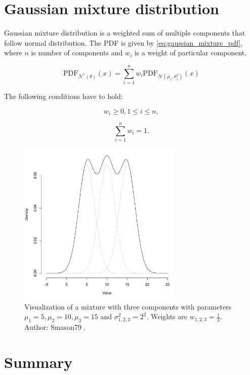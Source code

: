 \documentclass[thesis=B,english]{FITthesis}[2012/06/26]
\begin{document}
\section{Gaussian mixture distribution}

Gaussian mixture distribution is a weighted sum of multiple components that follow normal distribution. The PDF is given by \ref{eq:gaussian_mixture_pdf}, where $n$ is number of components and $w_i$ is a weight of particular component.

\begin{equation} \label{eq:gaussian_mixture_pdf}
\text{PDF}_{\mathcal{N}^*(\theta)}(x) = \sum_{i=1}^n w_i \text{PDF}_{\mathcal{N}(\mu_i,\sigma^2_i)}(x)
\end{equation}

The following conditions have to hold:

\begin{equation*}
w_i \geq 0, 1 \leq i \leq n,
\end{equation*}

\begin{equation*}
\sum_{i=1}^n w_i = 1.
\end{equation*}

\begin{figure}
	\centering
 	\includegraphics[width=0.7\textwidth]{gaussian_mixture}
 	\caption{Visualization of a mixture with three components with parameters $\mu_1=5, \mu_2=10, \mu_3=15$ and $\sigma_{1,2,3}^2=2^2$. Weights are $w_{1,2,3} = \frac{1}{3}$. Author: Smason79 \cite{gaussian-mixture}.}
 	\label{fig:gaussian_mixture}
\end{figure}

\section{Summary}
\end{document}
